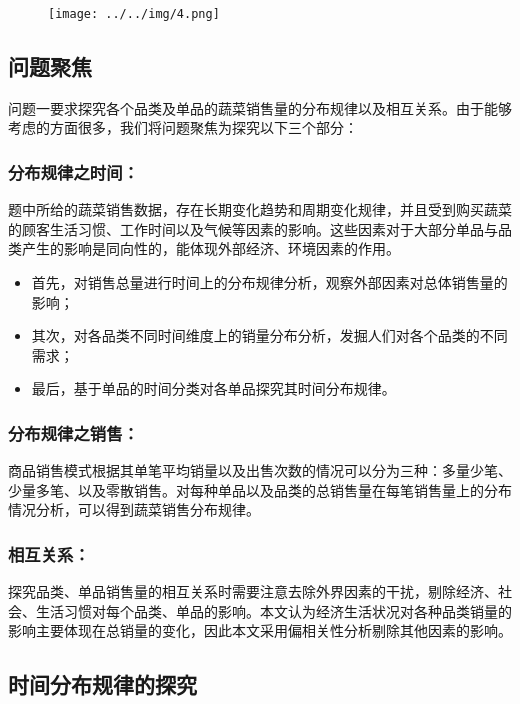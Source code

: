 \documentclass[withoutpreface,bwprint]{cumcmthesis} %
\begin{document}
\begin{figure}[H]
    \small
    \centering
    \texttt{[image: ../../img/4.png]}
	\label{fig4}
\end{figure}

\subsection{问题聚焦}

问题一要求探究各个品类及单品的蔬菜销售量的分布规律以及相互关系。由于能够考虑的方面很多，我们将问题聚焦为探究以下三个部分：

\subsubsection{分布规律之时间：}

题中所给的蔬菜销售数据，存在长期变化趋势和周期变化规律，并且受到购买蔬菜的顾客生活习惯、工作时间以及气候等因素的影响。这些因素对于大部分单品与品类产生的影响是同向性的，能体现外部经济、环境因素的作用。

\begin{itemize}
	\item 首先，对销售总量进行时间上的分布规律分析，观察外部因素对总体销售量的影响；
	\item 其次，对各品类不同时间维度上的销量分布分析，发掘人们对各个品类的不同需求；
	\item 最后，基于单品的时间分类对各单品探究其时间分布规律。
\end{itemize}

\subsubsection{分布规律之销售：}

商品销售模式根据其单笔平均销量以及出售次数的情况可以分为三种：多量少笔、少量多笔、以及零散销售。对每种单品以及品类的总销售量在每笔销售量上的分布情况分析，可以得到蔬菜销售分布规律。

\subsubsection{相互关系：}

探究品类、单品销售量的相互关系时需要注意去除外界因素的干扰，剔除经济、社会、生活习惯对每个品类、单品的影响。本文认为经济生活状况对各种品类销量的影响主要体现在总销量的变化，因此本文采用偏相关性分析剔除其他因素的影响。

\subsection{时间分布规律的探究}
\end{document}
